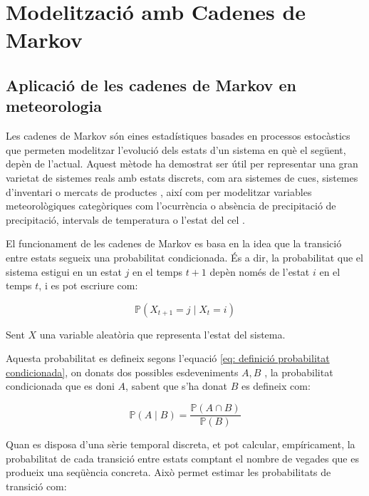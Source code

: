 \documentclass[../main.tex]{subfiles}
\begin{document}

\chapter{Modelització amb Cadenes de Markov} \label{ch:Cadenes de Markov}

\section{Aplicació de les cadenes de Markov en meteorologia}

Les cadenes de Markov són eines estadístiques basades en processos estocàstics que permeten modelitzar l'evolució dels estats d’un sistema en què el següent, depèn de l'actual. Aquest mètode ha demostrat ser útil per representar una gran varietat de sistemes reals amb estats discrets, com ara sistemes de cues, sistemes d’inventari o mercats de productes \parencite{liu2010application}, així com per modelitzar variables meteorològiques categòriques com l’ocurrència o absència de precipitació de precipitació, intervals de temperatura o l'estat del cel \parencite{gabriel1962markov}.  

El funcionament de les cadenes de Markov es basa en la idea que la transició entre estats segueix una probabilitat condicionada. És a dir, la probabilitat que el sistema estigui en un estat $j$ en el temps $t+1$ depèn només de l'estat $i$ en el temps $t$, i es pot escriure com:

\begin{equation}
\mathbb{P}(X_{t+1} = j \mid X_t = i)
\label{eq: notació probabilitat transició}
\end{equation}

Sent $X$ una variable aleatòria que representa l'estat del sistema.

Aquesta probabilitat es defineix segons l'equació \cref{eq: definició probabilitat condicionada}, on donats dos possibles esdeveniments $A , B$ , la probabilitat condicionada que es doni $A$, sabent que s'ha donat $B$ es defineix com: 

\begin{equation}
\mathbb{P}(A \mid B) = \frac{\mathbb{P}(A \cap B)}{\mathbb{P}(B)}
\label{eq: definició probabilitat condicionada}
\end{equation}


Quan es disposa d’una sèrie temporal discreta, et pot calcular, empíricament, la probabilitat de cada transició entre estats comptant el nombre de vegades que es produeix una seqüència concreta. Això permet estimar les probabilitats de transició com: 
\end{document}
